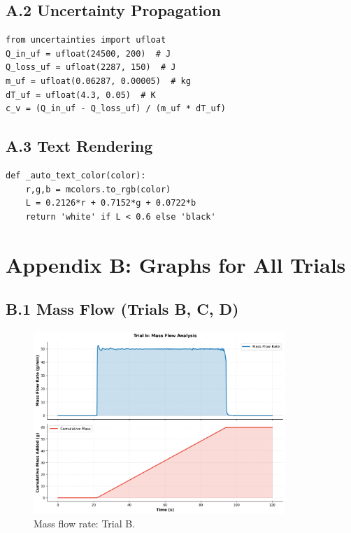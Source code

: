 \documentclass[12pt]{article}
\begin{document}
\subsection*{A.2 Uncertainty Propagation}

\begin{verbatim}
from uncertainties import ufloat
Q_in_uf = ufloat(24500, 200)  # J
Q_loss_uf = ufloat(2287, 150)  # J
m_uf = ufloat(0.06287, 0.00005)  # kg
dT_uf = ufloat(4.3, 0.05)  # K
c_v = (Q_in_uf - Q_loss_uf) / (m_uf * dT_uf)
\end{verbatim}

\subsection*{A.3 Text Rendering}

\begin{verbatim}
def _auto_text_color(color):
    r,g,b = mcolors.to_rgb(color)
    L = 0.2126*r + 0.7152*g + 0.0722*b
    return 'white' if L < 0.6 else 'black'
\end{verbatim}

\section*{Appendix B: Graphs for All Trials}

\subsection*{B.1 Mass Flow (Trials B, C, D)}

\begin{figure}[H]
\centering
\includegraphics[width=0.85\textwidth]{graphs/part1_trial_b_mass_flow.png}
\caption{Mass flow rate: Trial B.}
\end{figure}
\end{document}

